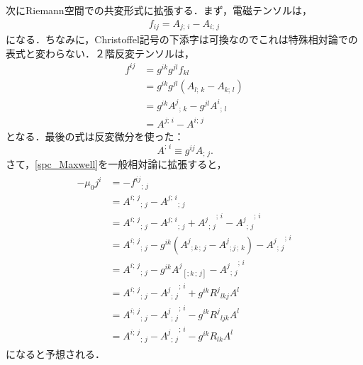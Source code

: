 \documentclass[a4paper]{ltjsreport}
\begin{document}
次にRiemann空間での共変形式に拡張する．まず，電磁テンソルは，
\begin{align}
  f_{ij}=A_{j;\,i} - A_{i;\,j}
\end{align}
になる．ちなみに，Christoffel記号の下添字は可換なのでこれは特殊相対論での表式と変わらない．２階反変テンソルは，
\begin{align*}
  f^{ij} &= g^{ik}g^{jl}f_{kl}\\
  &= g^{ik}g^{jl}\left(A_{l;\,k} - A_{k;\,l}\right)\\
  &= g^{ik}{A^j}_{;\,k} - g^{jl}{A^i}_{;\,l}\\
  &= A^{j;\,i} - A^{i;\,j}
\end{align*}
となる．最後の式は反変微分を使った：
\[\,A^{;\,i}\equiv{g}^{ij}A_{;\,j}.\]
さて，\eqref{spc_Maxwell}を一般相対論に拡張すると，
\begin{align}
  \label{gen_Maxwell}
  \begin{split}
     - \mu_0j^i &=  - {f^{ij}}_{;\,j}\\
    &= {A^{i;\,j}}_{;\,j} - {A^{j;\,i}}_{;\,j}\\
    &= {A^{i;\,j}}_{;\,j} - {A^{j;\,i}}_{;\,j} + {{A^j}_{;\,j}}^{;\,i} - {{A^j}_{;\,j}}^{;\,i}\\
    &= {A^{i;\,j}}_{;\,j} - g^{ik}\left({A^j}_{;k\,;\,j} - {A^j}_{;j\,;\,k}\right) - {{A^j}_{;\,j}}^{;\,i}\\
    &= {A^{i;\,j}}_{;\,j} - g^{ik}{A^j}_{\left[;k\,;\,j\right]} - {{A^j}_{;\,j}}^{;\,i}\\
    &= {A^{i;\,j}}_{;\,j} - {{A^j}_{;\,j}}^{;\,i} + g^{ik}{R^j}_{lkj}A^l\\
    &= {A^{i;\,j}}_{;\,j} - {{A^j}_{;\,j}}^{;\,i} - g^{ik}{R^j}_{ljk}A^l\\
    &= {A^{i;\,j}}_{;\,j} - {{A^j}_{;\,j}}^{;\,i} - g^{ik}{R}_{lk}A^l
  \end{split}
\end{align}
になると予想される．
\end{document}
